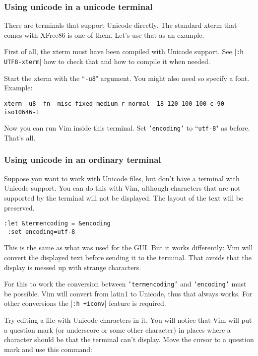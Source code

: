 \subsubsection{Using unicode in a unicode terminal}
There are terminals that support Unicode directly.
The standard xterm that comes with XFree86 is one of them.
Let's use that as an example.

First of all, the xterm must have been compiled with Unicode support.
See |\texttt{:h UTF8-xterm}| how to check that and how to compile it when needed.

Start the xterm with the ``\texttt{-u8}" argument.
You might also need so specify a font.
Example:

\begin{Verbatim}[samepage=true]
   xterm -u8 -fn -misc-fixed-medium-r-normal--18-120-100-100-c-90-iso10646-1
\end{Verbatim}

Now you can run Vim inside this terminal.
Set \texttt{'encoding'} to ``\texttt{utf-8}" as before.
That's all.

\subsubsection{Using unicode in an ordinary terminal}
Suppose you want to work with Unicode files, but don't have a terminal with Unicode support.
You can do this with Vim, although characters that are not supported by the terminal will not be displayed.
The layout of the text will be preserved.

\begin{Verbatim}[samepage=true]
 :let &termencoding = &encoding
 :set encoding=utf-8
\end{Verbatim}

This is the same as what was used for the GUI.
But it works differently: Vim will convert the displayed text before sending it to the terminal.
That avoids that the display is messed up with strange characters.

For this to work the conversion between \texttt{'termencoding'} and \texttt{'encoding'} must be possible.
Vim will convert from latin1 to Unicode, thus that always works.
For other conversions the |\texttt{:h +iconv}| feature is required.

Try editing a file with Unicode characters in it.
You will notice that Vim will put a question mark (or underscore or some other character) in places where a character should be that the terminal can't display.
Move the cursor to a question mark and use this command:

